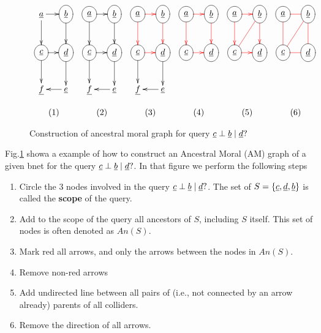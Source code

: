 \documentclass[12pt]{report}
\begin{document}
\begin{figure}
$$
\begin{array}{cccccc}
\xymatrix@C=1pc{
\rva\ar[r]\ar[d]
&\Circle{\rvb}\ar[d]
\\
\Circle{\rvc}\ar[r]\ar[d]
&\Circle{\rvd}\ar[d]
\\
\rvf
&\rve\ar[l]
}
&
\xymatrix@C=1pc{
\Circle{\rva}\ar[r]\ar[d]
&\Circle{\rvb}\ar[d]
\\
\Circle{\rvc}\ar[r]\ar[d]
&\Circle{\rvd}\ar[d]
\\
\rvf
&\rve\ar[l]
}
&
\xymatrix@C=1pc{
\Circle{\rva}\ar@[red][r]\ar@[red][d]
&\Circle{\rvb}\ar@[red][d]
\\
\Circle{\rvc}\ar@[red][r]\ar[d]
&\Circle{\rvd}\ar[d]
\\
\rvf
&\rve\ar[l]
}
&
\xymatrix@C=1pc{
\Circle{\rva}\ar@[red][r]\ar@[red][d]
&\Circle{\rvb}\ar@[red][d]
\\
\Circle{\rvc}\ar@[red][r]
&\Circle{\rvd}
}
&
\xymatrix@C=1pc{
\Circle{\rva}\ar@[red][r]\ar@[red][d]
&\Circle{\rvb}\ar@[red][d]
\ar@[red]@{-}[dl]
\\
\Circle{\rvc}\ar@[red][r]
&\Circle{\rvd}
}
&
\xymatrix@C=1pc{
\Circle{\rva}\ar@{-}@[red][r]\ar@{-}@[red][d]
&\Circle{\rvb}\ar@{-}@[red][d]
\ar@{-}@[red][dl]
\\
\Circle{\rvc}\ar@{-}@[red][r]
&\Circle{\rvd}
}
\\
\\
(1)
&(2)
&(3)
&(4)
&(5)
&(6)
\end{array}
$$
\caption{Construction of ancestral moral graph
for query $\rvc\perp \rvb\mid \rvd?$}
\label{fig-anc-moral-c-b-d}
\end{figure}

Fig.\ref{fig-anc-moral-c-b-d}
showa a example of how to construct an Ancestral Moral (AM) graph
of a given bnet for the query 
$\rvc\perp \rvb\mid \rvd?$.
In that figure
we perform the following steps

\begin{enumerate}
\item Circle the 3 nodes involved 
in the query $\rvc\perp \rvb\mid \rvd?$.
The set of $S=\{\rvc, \rvd, \rvb\}$
is called the {\bf scope} of the query.

\item Add to the scope of the  query 
all ancestors of $S$, including $S$ itself.
This set of nodes is often denoted as $An(S)$.

\item Mark red all arrows, and only the arrows between the 
nodes in $An(S)$.

\item Remove non-red arrows

\item Add undirected line between all 
pairs of  (i.e., not connected by an arrow already) parents of all colliders.

\item Remove the direction of all arrows.

\end{enumerate}
\end{document}
